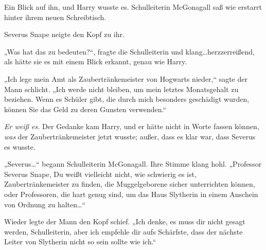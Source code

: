 Ein Blick auf ihn, und Harry wusste es. Schulleiterin McGonagall saß wie erstarrt hinter ihrem neuen Schreibtisch.

Severus Snape neigte den Kopf zu ihr.

„Was hat das zu bedeuten?“, fragte die Schulleiterin und klang…herzzerreißend, als hätte sie es mit einem Blick erkannt, genau wie Harry.

„Ich lege mein Amt als Zaubertränkemeister von Hogwarts nieder,“ sagte der Mann schlicht. „Ich werde nicht bleiben, um mein letztes Monatsgehalt zu beziehen. Wenn es Schüler gibt, die durch mich besonders geschädigt wurden, können Sie das Geld zu deren Gunsten verwenden.“

\emph{Er weiß es.}
Der Gedanke kam Harry, und er hätte nicht in Worte fassen können, \emph{was} der Zaubertränkemeister jetzt wusste; außer, dass es klar war, dass Severus es wusste.

„Severus…“ begann Schulleiterin McGonagall. Ihre Stimme klang hohl. „Professor Severus Snape, Du weißt vielleicht nicht, wie schwierig es ist, Zaubertränkemeister zu finden, die Muggelgeborene sicher unterrichten können, oder Professoren, die hart genug sind, um das Haus Slytherin in einem Anschein von Ordnung zu halten…“

Wieder legte der Mann den Kopf schief.
„Ich denke, es muss dir nicht gesagt werden, Schulleiterin, aber ich empfehle dir aufs Schärfste, dass der nächste Leiter von Slytherin nicht so sein sollte wie ich.“

